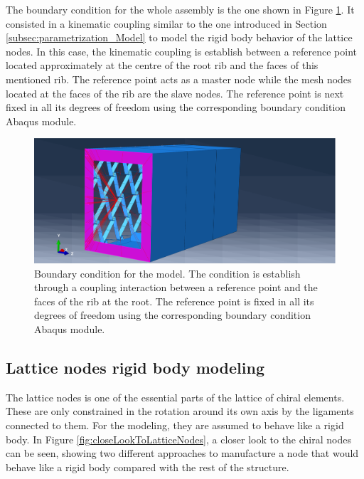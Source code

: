     The boundary condition for the whole assembly is the one shown in Figure \ref{fig:fixed}. It consisted in a kinematic coupling similar to the one introduced in Section \ref{subsec:parametrization_Model} to model the rigid body behavior of the lattice nodes. In this case, the kinematic coupling is establish between a reference point located approximately at the centre of the root rib and the faces of this mentioned rib. The reference point acts as a master node while the mesh nodes located at the faces of the rib are the slave nodes. The reference point is next fixed in all its degrees of freedom using the corresponding boundary condition Abaqus module.

    \begin{figure}[!htpb]
      \centering
      \includegraphics[width=0.8 \textwidth]{figures/../figures/result-model/fixed}
      \caption[Boundary condition for the model]{Boundary condition for the model. The condition is establish through a coupling interaction between a reference point and the faces of the rib at the root. The reference point is fixed in all its degrees of freedom using the corresponding boundary condition Abaqus module.}\label{fig:fixed}
    \end{figure}

  \clearpage
  \subsection{Lattice nodes rigid body modeling} \label{subsec:latticeNodesRigid_Parametrization}

    The lattice nodes is one of the essential parts of the lattice of chiral elements. These are only constrained in the rotation around its own axis by the ligaments connected to them. For the modeling, they are assumed to behave like a rigid body. In Figure \ref{fig:closeLookToLatticeNodes}, a closer look to the chiral nodes can be seen, showing two different approaches to manufacture a node that would behave like a rigid body compared with the rest of the structure.

